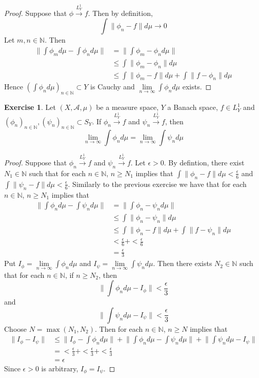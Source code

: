 \documentclass{book}
\theoremstyle{definition}
\newtheorem{ex}[definition]{Exercise}
\newcommand{\ep}{\epsilon}
\newcommand{\N}{\mathbb{N}}
\newcommand{\MA}{\mathcal{A}}
\newcommand{\lex}[1]{\label{ex:#1}}
\DeclareMathOperator*{\0}{\mbf{0}}
\DeclareMathOperator*{\1}{\mbf{1}}
\newcommand{\conv}[1]{\xrightarrow{#1}}
\begin{document}
	\begin{proof}
	Suppose that $\phi \conv{L^1_Y} f$. Then by definition, $$\int \|\phi_n -f\| d\mu \rightarrow 0$$ Let $m,n \in \N$. Then 
	\begin{align*}
	\bigg \|\int \phi_m d\mu - \int \phi_n d\mu \bigg \| 
	&= \bigg \| \int \phi_m  - \phi_n d\mu  \bigg \| \\
	& \leq  \int \|\phi_m  - \phi_n\| d \mu \\
	& \leq \int \|\phi_m  - f \| d \mu + \int \|f  - \phi_n\| d \mu
	\end{align*}
	Hence $( \int \phi_n  d \mu)_{n \in \N} \subset Y$ is Cauchy and $\lim\limits_{n \rightarrow \infty} \int \phi_n d\mu$ exists.
\end{proof}		

	\begin{ex} \lex{00000} 
	Let $(X, \MA, \mu)$ be a measure space, $Y$ a Banach space, $f \in L^1_Y$ and $(\phi_n)_{n \in \N}, (\psi_n)_{n \in \N} \subset S_Y$. If $\phi_n \conv{L^1_Y} f$ and $\psi_n \conv{L^1_Y} f$, then $$\lim\limits_{n \rightarrow \infty} \int \phi_n d\mu = \lim\limits_{n \rightarrow \infty} \int \psi_n d\mu$$
	\end{ex}
	
	\begin{proof}
	Suppose that $\phi_n \conv{L^1_Y} f$ and $\psi_n \conv{L^1_Y} f$. Let $\ep >0$. By defintion, there exist $N_1 \in \N$ such that for each $n \in \N$, $ n \geq N_1$ implies that $\int \|\phi_n - f\| d\mu < \frac{\ep}{6}$ and $\int \|\psi_n - f\| d\mu < \frac{\ep}{6}$. Similarly to the previous exercise we have that for each $n \in \N$, $n \geq N_1$ implies that
	\begin{align*}
	\bigg \| \int \phi_n d\mu  - \int \psi_n d \mu \bigg \|
	&= \bigg \| \int \phi_n - \psi_n d\mu \bigg \| \\
	& \leq \int \| \phi_n - \psi_n \| d\mu \\
	& \leq  \int \| \phi_n -f \| d \mu + \int \| f - \psi_n \| d\mu 	\\
	& <  \frac{\ep}{6} + < \frac{\ep}{6} \\
	&= \frac{\ep}{3}
	\end{align*}	 
Put $I_\phi = \lim\limits_{n \rightarrow \infty} \int \phi_n d\mu$ and $I_{\psi} = \lim\limits_{n \rightarrow \infty} \int \psi_n d\mu$. Then there exists $N_2 \in \N$ such that for each $n \in \N$, if $ n \geq N_2$, then $$\bigg \| \int \phi_n d\mu - I_\phi \bigg \| < \frac{\ep}{3}$$ and $$\bigg \| \int \psi_n d\mu - I_\psi \bigg \| < \frac{\ep}{3}$$ 
	Choose $N = \max(N_1, N_2)$. Then for each $n \in \N$, $n \geq N$ implies that
	\begin{align*}
	\|I_\phi - I_\psi\| 
	& \leq \bigg \|I_\phi - \int \phi_n d\mu \bigg \| + \bigg \| \int \phi_n d\mu - \int \psi_n d\mu \bigg \| +  \bigg \| \int \psi_n d\mu - I_\psi \bigg \| \\
	& = < \frac{\ep}{3} + < \frac{\ep}{3} + < \frac{\ep}{3} \\
	&= \ep
	\end{align*}
	Since $\ep >0$ is arbitrary, $I_\phi = I_\psi$.
	\end{proof}
	
\end{document}
